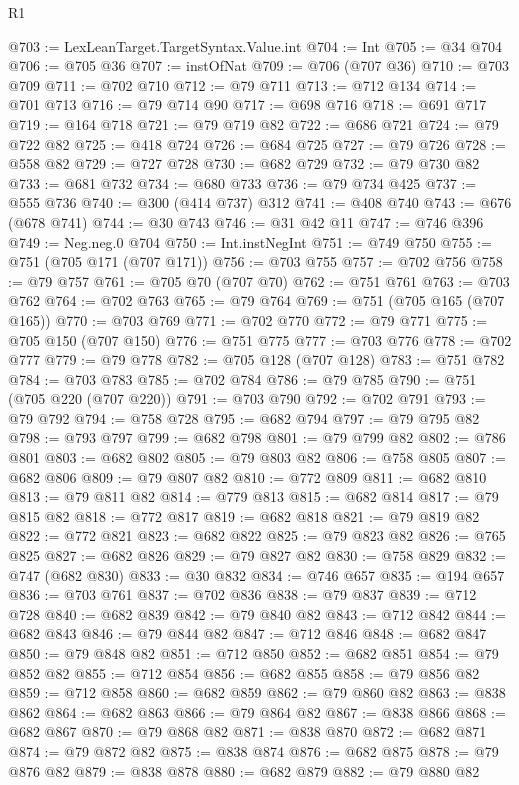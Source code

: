 \begin{lexlean}{R1}
\begin{coremodule}
@703 := LexLeanTarget.TargetSyntax.Value.int
@704 := Int
@705 := @34 @704
@706 := @705 @36
@707 := instOfNat
@709 := @706 (@707 @36)
@710 := @703 @709
@711 := @702 @710
@712 := @79 @711
@713 := @712 @134
@714 := @701 @713
@716 := @79 @714 @90
@717 := @698 @716
@718 := @691 @717
@719 := @164 @718
@721 := @79 @719 @82
@722 := @686 @721
@724 := @79 @722 @82
@725 := @418 @724
@726 := @684 @725
@727 := @79 @726
@728 := @558 @82
@729 := @727 @728
@730 := @682 @729
@732 := @79 @730 @82
@733 := @681 @732
@734 := @680 @733
@736 := @79 @734 @425
@737 := @555 @736
@740 := @300 (@414 @737) @312
@741 := @408 @740
@743 := @676 (@678 @741)
@744 := @30 @743
@746 := @31 @42 @11
@747 := @746 @396
@749 := Neg.neg.{0} @704
@750 := Int.instNegInt
@751 := @749 @750
@755 := @751 (@705 @171 (@707 @171))
@756 := @703 @755
@757 := @702 @756
@758 := @79 @757
@761 := @705 @70 (@707 @70)
@762 := @751 @761
@763 := @703 @762
@764 := @702 @763
@765 := @79 @764
@769 := @751 (@705 @165 (@707 @165))
@770 := @703 @769
@771 := @702 @770
@772 := @79 @771
@775 := @705 @150 (@707 @150)
@776 := @751 @775
@777 := @703 @776
@778 := @702 @777
@779 := @79 @778
@782 := @705 @128 (@707 @128)
@783 := @751 @782
@784 := @703 @783
@785 := @702 @784
@786 := @79 @785
@790 := @751 (@705 @220 (@707 @220))
@791 := @703 @790
@792 := @702 @791
@793 := @79 @792
@794 := @758 @728
@795 := @682 @794
@797 := @79 @795 @82
@798 := @793 @797
@799 := @682 @798
@801 := @79 @799 @82
@802 := @786 @801
@803 := @682 @802
@805 := @79 @803 @82
@806 := @758 @805
@807 := @682 @806
@809 := @79 @807 @82
@810 := @772 @809
@811 := @682 @810
@813 := @79 @811 @82
@814 := @779 @813
@815 := @682 @814
@817 := @79 @815 @82
@818 := @772 @817
@819 := @682 @818
@821 := @79 @819 @82
@822 := @772 @821
@823 := @682 @822
@825 := @79 @823 @82
@826 := @765 @825
@827 := @682 @826
@829 := @79 @827 @82
@830 := @758 @829
@832 := @747 (@682 @830)
@833 := @30 @832
@834 := @746 @657
@835 := @194 @657
@836 := @703 @761
@837 := @702 @836
@838 := @79 @837
@839 := @712 @728
@840 := @682 @839
@842 := @79 @840 @82
@843 := @712 @842
@844 := @682 @843
@846 := @79 @844 @82
@847 := @712 @846
@848 := @682 @847
@850 := @79 @848 @82
@851 := @712 @850
@852 := @682 @851
@854 := @79 @852 @82
@855 := @712 @854
@856 := @682 @855
@858 := @79 @856 @82
@859 := @712 @858
@860 := @682 @859
@862 := @79 @860 @82
@863 := @838 @862
@864 := @682 @863
@866 := @79 @864 @82
@867 := @838 @866
@868 := @682 @867
@870 := @79 @868 @82
@871 := @838 @870
@872 := @682 @871
@874 := @79 @872 @82
@875 := @838 @874
@876 := @682 @875
@878 := @79 @876 @82
@879 := @838 @878
@880 := @682 @879
@882 := @79 @880 @82

\end{coremodule}
\end{lexlean}
